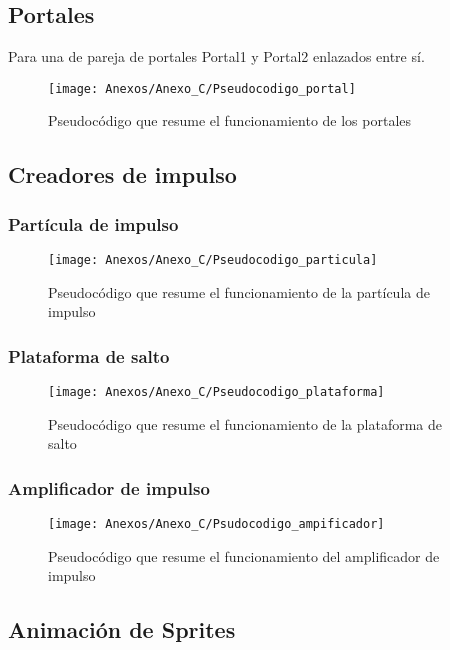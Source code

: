 \subsection{Portales}
Para una de pareja de portales Portal1 y Portal2 enlazados entre sí.

\begin{figure}[h]
\centering
\texttt{[image: Anexos/Anexo\_C/Pseudocodigo\_portal]}
\caption{Pseudocódigo que resume el funcionamiento de los portales}
\end{figure}
\clearpage

\subsection{Creadores de impulso}
\subsubsection{Partícula de impulso}

\begin{figure}[h]
\centering
\texttt{[image: Anexos/Anexo\_C/Pseudocodigo\_particula]}
\caption{Pseudocódigo que resume el funcionamiento de la partícula de impulso}
\end{figure}

\subsubsection{Plataforma de salto}

\begin{figure}[h]
\centering
\texttt{[image: Anexos/Anexo\_C/Pseudocodigo\_plataforma]}
\caption{Pseudocódigo que resume el funcionamiento de la plataforma de salto}
\end{figure}

\subsubsection{Amplificador de impulso}

\begin{figure}[h]
\centering
\texttt{[image: Anexos/Anexo\_C/Psudocodigo\_ampificador]}
\caption{Pseudocódigo que resume el funcionamiento del amplificador de impulso}
\end{figure}

\clearpage
\subsection{Animación de Sprites}
